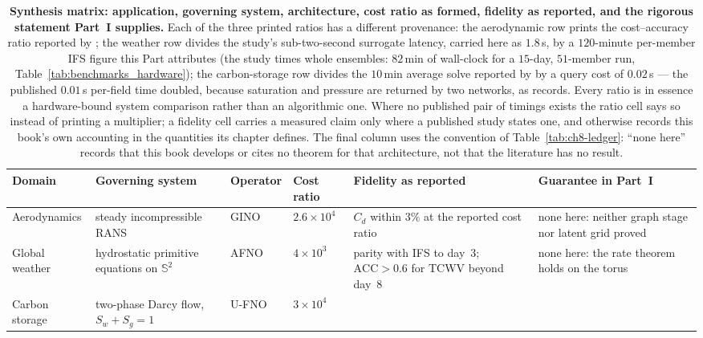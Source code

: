 \begin{table}[t]
\centering
\footnotesize
\caption{\textbf{Synthesis matrix: application, governing system, architecture, cost ratio as formed, fidelity as reported, and the rigorous statement Part~I supplies.} Each of the three printed ratios has a different provenance: the aerodynamic row prints the cost--accuracy ratio reported by \cite{li2023geometry}; the weather row divides the study's sub-two-second surrogate latency, carried here as $1.8$\,s, by a $120$-minute per-member IFS figure this Part attributes (the study times whole ensembles: $82$\,min of wall-clock for a $15$-day, $51$-member run, Table~\ref{tab:benchmarks_hardware}); the carbon-storage row divides the $10$\,min average solve reported by \cite{wen2022ufno} by a query cost of $0.02$\,s --- the published $0.01$\,s per-field time doubled, because saturation and pressure are returned by two networks, as
 records. Every ratio is in essence a hardware-bound system comparison rather than an algorithmic one. Where no published pair of timings exists the ratio cell says so instead of printing a multiplier; a fidelity cell carries a measured claim only where a published study states one, and otherwise records this book's own accounting in the quantities its chapter defines. The final column uses the convention of Table~\ref{tab:ch8-ledger}: ``none here'' records that this book develops or cites no theorem for that architecture, not that the literature has no result.}
\label{tab:synthesis_matrix}
\begin{tabularx}{\textwidth}{@{}l >{\raggedright\arraybackslash}X l l >{\raggedright\arraybackslash}X >{\raggedright\arraybackslash}X@{}}
\toprule
\textbf{Domain} & \textbf{Governing system} & \textbf{Operator} & \textbf{Cost ratio} & \textbf{Fidelity as reported} & \textbf{Guarantee in Part~I} \\
\midrule
Aerodynamics
& steady incompressible RANS
& GINO \cite{li2023geometry}
& $2.6\times10^{4}$
& $C_d$ within $3\%$ at the reported cost ratio
& none here: neither graph stage nor latent grid proved
\\
\addlinespace
Global weather
& hydrostatic primitive equations on $\mathbb{S}^{2}$
& AFNO \cite{pathak2022fourcastnet}
& $4\times10^{3}$
& parity with IFS to day~3; $\mathrm{ACC}>0.6$ for TCWV beyond day~8
& none here: the rate theorem holds on the torus
\\
\addlinespace
Carbon storage
& two-phase Darcy flow, $S_w+S_g=1$
& U-FNO \cite{wen2022ufno}
& $3\times10^{4}$

\end{tabularx}
\end{table}

